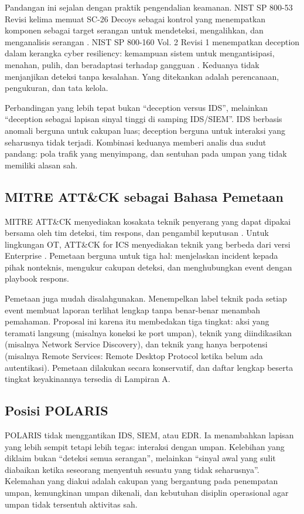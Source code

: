 \documentclass[12pt,a4paper]{article}
\begin{document}
Pandangan ini sejalan dengan praktik pengendalian keamanan. NIST SP 800-53 Revisi kelima memuat SC-26 Decoys sebagai kontrol yang menempatkan komponen sebagai target serangan untuk mendeteksi, mengalihkan, dan menganalisis serangan \citep{nist80053}. NIST SP 800-160 Vol. 2 Revisi 1 menempatkan deception dalam kerangka cyber resiliency: kemampuan sistem untuk mengantisipasi, menahan, pulih, dan beradaptasi terhadap gangguan \citep{nist800160}. Keduanya tidak menjanjikan deteksi tanpa kesalahan. Yang ditekankan adalah perencanaan, pengukuran, dan tata kelola.

Perbandingan yang lebih tepat bukan ``deception versus IDS'', melainkan ``deception sebagai lapisan sinyal tinggi di samping IDS/SIEM''. IDS berbasis anomali berguna untuk cakupan luas; deception berguna untuk interaksi yang seharusnya tidak terjadi. Kombinasi keduanya memberi analis dua sudut pandang: pola trafik yang menyimpang, dan sentuhan pada umpan yang tidak memiliki alasan sah.

\subsection{MITRE ATT\&CK sebagai Bahasa Pemetaan}

MITRE ATT\&CK menyediakan kosakata teknik penyerang yang dapat dipakai bersama oleh tim deteksi, tim respons, dan pengambil keputusan \citep{mitre_attack}. Untuk lingkungan OT, ATT\&CK for ICS menyediakan teknik yang berbeda dari versi Enterprise \citep{mitre_ics}. Pemetaan berguna untuk tiga hal: menjelaskan incident kepada pihak nonteknis, mengukur cakupan deteksi, dan menghubungkan event dengan playbook respons.

Pemetaan juga mudah disalahgunakan. Menempelkan label teknik pada setiap event membuat laporan terlihat lengkap tanpa benar-benar menambah pemahaman. Proposal ini karena itu membedakan tiga tingkat: aksi yang teramati langsung (misalnya koneksi ke port umpan), teknik yang diindikasikan (misalnya Network Service Discovery), dan teknik yang hanya berpotensi (misalnya Remote Services: Remote Desktop Protocol ketika belum ada autentikasi). Pemetaan dilakukan secara konservatif, dan daftar lengkap beserta tingkat keyakinannya tersedia di Lampiran A.

\subsection{Posisi POLARIS}

POLARIS tidak menggantikan IDS, SIEM, atau EDR. Ia menambahkan lapisan yang lebih sempit tetapi lebih tegas: interaksi dengan umpan. Kelebihan yang diklaim bukan ``deteksi semua serangan'', melainkan ``sinyal awal yang sulit diabaikan ketika seseorang menyentuh sesuatu yang tidak seharusnya''. Kelemahan yang diakui adalah cakupan yang bergantung pada penempatan umpan, kemungkinan umpan dikenali, dan kebutuhan disiplin operasional agar umpan tidak tersentuh aktivitas sah.
\end{document}
